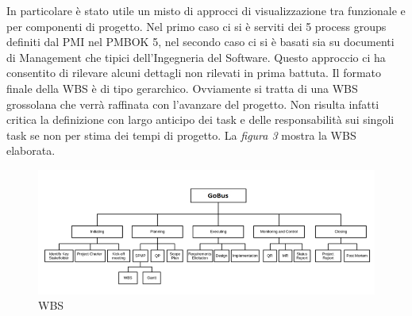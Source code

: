 In particolare \`{e} stato utile un misto di approcci di visualizzazione tra funzionale e per componenti di progetto. Nel primo caso ci si \`{e} serviti dei 5 process groups definiti dal PMI nel PMBOK 5, nel secondo caso ci si \`{e} basati sia su documenti di Management che tipici dell\rq Ingegneria del Software.
Questo approccio ci ha consentito di rilevare alcuni dettagli non rilevati in prima battuta. 
Il formato finale della WBS \`{e} di tipo gerarchico. Ovviamente si tratta di una WBS grossolana che verr\`{a} raffinata con l\rq avanzare del progetto. Non risulta infatti critica la definizione con largo anticipo dei task e delle responsabilit\`{a} sui singoli task se non per stima dei tempi di progetto.
La \emph{figura 3} mostra la WBS elaborata.

\begin{figure}[tp]
\centering
\includegraphics[scale=.6]{img/6.png}
\caption{WBS}
\label{fig:cd}
\end{figure}

